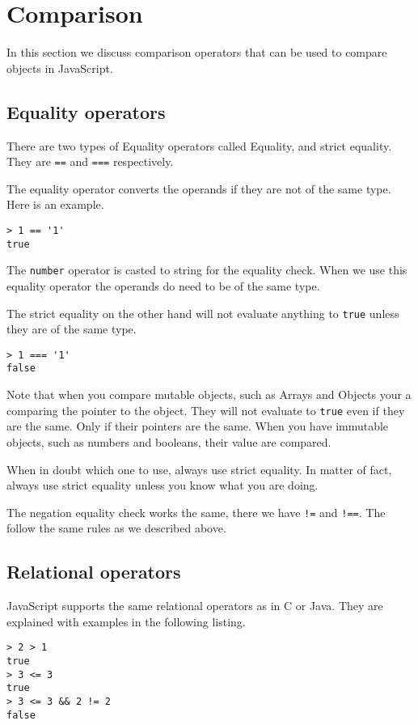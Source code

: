 \section{Comparison}\label{sec:comparison}
In this section we discuss comparison operators that can be used to compare objects in JavaScript.


\subsection{Equality operators}
There are two types of Equality operators called Equality, and strict equality. They are \texttt{==} and \texttt{===} respectively.

The equality operator converts the operands if they are not of the same type. Here is an example.

\begin{lstlisting}
> 1 == '1'
true
\end{lstlisting}

The \texttt{number} operator is casted to string for the equality check. When we use this equality operator the operands do need to be of the same type.

The strict equality on the other hand will not evaluate anything to \texttt{true} unless they are of the same type.

\begin{lstlisting}
> 1 === '1'
false
\end{lstlisting}

Note that when you compare mutable objects, such as Arrays and Objects your a comparing the pointer to the object. They will not evaluate to \texttt{true} even if they are the same. Only if their pointers are the same. When you have immutable objects, such as numbers and booleans, their value are compared. 

When in doubt which one to use, always use strict equality. In matter of fact, always use strict equality unless you know what you are doing.

The negation equality check works the same, there we have \texttt{!=} and \texttt{!==}. The follow the same rules as we described above.

\subsection{Relational operators}
JavaScript supports the same relational operators as in C or Java. They are explained with examples in the following listing.

\begin{lstlisting}
> 2 > 1
true
> 3 <= 3
true
> 3 <= 3 && 2 != 2
false
\end{lstlisting}

